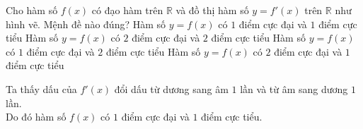\begin{ex}%
    \immini
    {
        Cho hàm số $f(x)$ có đạo hàm trên $\mathbb{R}$ và đồ thị hàm số $y=f'(x)$ trên $\mathbb{R}$ như hình vẽ. Mệnh đề nào đúng?
        \choice
        {\True Hàm số $y=f(x)$ có $1$ điểm cực đại và $1$ điểm cực tiểu}
        {Hàm số $y=f(x)$ có $2$ điểm cực đại và $2$ điểm cực tiểu}
        {Hàm số $y=f(x)$ có $1$ điểm cực đại và $2$ điểm cực tiểu}
        {Hàm số $y=f(x)$ có $2$ điểm cực đại và $1$ điểm cực tiểu}
    }
    {
    }
    \loigiai
    {
        Ta thấy dấu của $f'(x)$ đổi dấu từ dương sang âm $1$ lần và từ âm sang dương $1$ lần.\\
        Do đó hàm số $f(x)$ có $1$ điểm cực đại và $1$ điểm cực tiểu.
    }
\end{ex}

